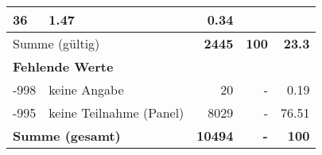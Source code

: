 \begin{longtable}{lXrrr}
       \num{36} &
       \num[round-mode=places,round-precision=2]{1,47} &
         \num[round-mode=places,round-precision=2]{0,34} \\
     \midrule
     \multicolumn{2}{l}{Summe (gültig)} &
       \textbf{\num{2445}} &
     \textbf{100} &
       \textbf{\num[round-mode=places,round-precision=2]{23,3}} \\
     \multicolumn{5}{l}{\textbf{Fehlende Werte}}\\
       -998 &
       keine Angabe &
         \num{20} &
        - &
         \num[round-mode=places,round-precision=2]{0,19} \\
       -995 &
       keine Teilnahme (Panel) &
         \num{8029} &
        - &
         \num[round-mode=places,round-precision=2]{76,51} \\
     \midrule
     \multicolumn{2}{l}{\textbf{Summe (gesamt)}} &
          \textbf{\num{10494}} &
        \textbf{-} &
        \textbf{100} \\
     \bottomrule
     \end{longtable}
     
